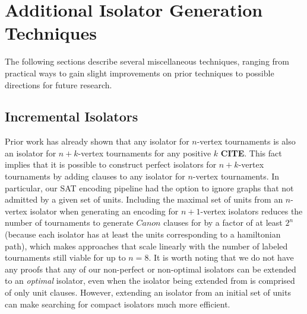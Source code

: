 \documentclass[conference]{IEEEtran}
\begin{document}






\section{Additional Isolator Generation Techniques}

The following sections describe several miscellaneous techniques, ranging from practical ways to gain slight improvements on prior techniques to possible directions for future research.

\subsection{Incremental Isolators}
Prior work has already shown that any isolator for $n$-vertex tournaments is also an isolator for $n+k$-vertex tournaments for any positive $k$ \textbf{CITE}. This fact implies that it is possible to construct perfect isolators for $n+k$-vertex tournaments by adding clauses to any isolator for $n$-vertex tournaments. In particular, our SAT encoding pipeline had the option to ignore graphs that not admitted by a given set of units. Including the maximal set of units from an $n$-vertex isolator when generating an encoding for $n+1$-vertex isolators reduces the number of tournaments to generate $\mathit{Canon}$ clauses for by a factor of at least $2^{n}$ (because each isolator has at least the units corresponding to a hamiltonian path), which makes approaches that scale linearly with the number of labeled tournaments still viable for up to $n = 8$.  It is worth noting that we do not have any proofs that any of our non-perfect or non-optimal isolators can be extended to an \textit{optimal} isolator, even when the isolator being extended from is comprised of only unit clauses.  However, extending an isolator from an initial set of units can make searching for compact isolators much more efficient. 
\end{document}
